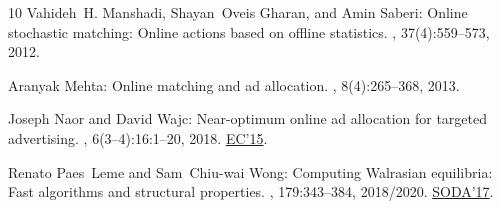 \begin{thebibliography}{10}
{\sc Vahideh~H. Manshadi, Shayan~Oveis Gharan, and Amin Saberi}: Online
  stochastic matching: {O}nline actions based on offline statistics.
, 37(4):559--573, 2012.

{\sc Aranyak Mehta}: Online matching and ad allocation.
, 8(4):265--368, 2013.
\newblock [\epfmtdoi{10.1561/0400000057}]

{\sc Joseph Naor and David Wajc}: Near-optimum online ad allocation for
  targeted advertising.
, 6(3--4):16:1--20, 2018.
\newblock \prelim \href{https://doi.org/10.1145/2764468.2764482}{EC'15}.
\newblock [\epfmtdoi{10.1145/3105447}]

{\sc Renato Paes~Leme and Sam~Chiu{-}wai Wong}: Computing {W}alrasian
  equilibria: {F}ast algorithms and structural properties.
, 179:343--384, 2018/2020.
\newblock \prelim \href{https://doi.org/10.1137/1.9781611974782.42}{SODA'17}.
\newblock [\epfmtdoi{10.1007/s10107-018-1334-9}]

\end{thebibliography}